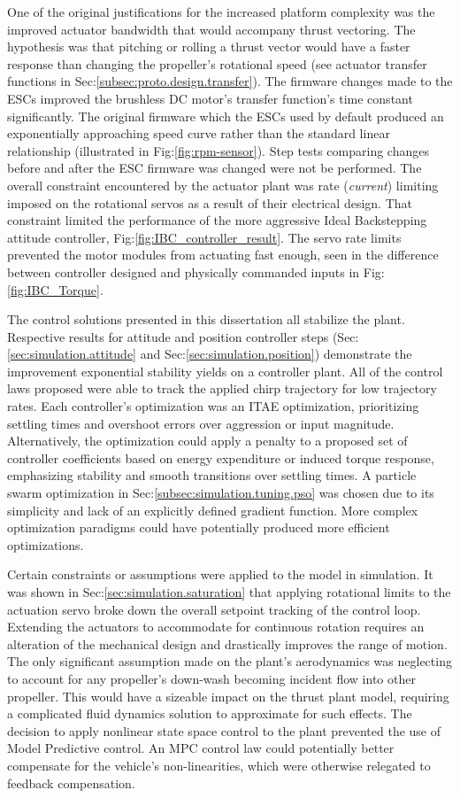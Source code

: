 \par
One of the original justifications for the increased platform complexity was the improved actuator bandwidth that would accompany thrust vectoring. The hypothesis was that pitching or rolling a thrust vector would have a faster response than changing the propeller's rotational speed (see actuator transfer functions in Sec:\ref{subsec:proto.design.transfer}). The firmware changes made to the ESCs improved the brushless DC motor's transfer function's time constant significantly. The original firmware which the ESCs used by default produced an exponentially approaching speed curve rather than the standard linear relationship (illustrated in Fig:\ref{fig:rpm-sensor}). Step tests comparing changes before and after the ESC firmware was changed were not be performed. The overall constraint encountered by the actuator plant was rate (\emph{current}) limiting imposed on the rotational servos as a result of their electrical design. That constraint limited the performance of the more aggressive Ideal Backstepping attitude controller, Fig:\ref{fig:IBC_controller_result}. The servo rate limits prevented the motor modules from actuating fast enough, seen in the difference between controller designed and physically commanded inputs in Fig:\ref{fig:IBC_Torque}.
\par
The control solutions presented in this dissertation all stabilize the plant. Respective results for attitude and position controller steps (Sec:\ref{sec:simulation.attitude} and Sec:\ref{sec:simulation.position}) demonstrate the improvement exponential stability yields on a controller plant. All of the control laws proposed were able to track the applied chirp trajectory for low trajectory rates. Each controller's optimization was an ITAE optimization, prioritizing settling times and overshoot errors over aggression or input magnitude. Alternatively, the optimization could apply a penalty to a proposed set of controller coefficients based on energy expenditure or induced torque response, emphasizing stability and smooth transitions over settling times. A particle swarm optimization in Sec:\ref{subsec:simulation.tuning.pso} was chosen due to its simplicity and lack of an explicitly defined gradient function. More complex optimization paradigms could have potentially produced more efficient optimizations.
\par
Certain constraints or assumptions were applied to the model in simulation. It was shown in Sec:\ref{sec:simulation.saturation} that applying rotational limits to the actuation servo broke down the overall setpoint tracking of the control loop. Extending the actuators to accommodate for continuous rotation requires an alteration of the mechanical design and drastically improves the range of motion. The only significant assumption made on the plant's aerodynamics was neglecting to account for any propeller's down-wash becoming incident flow into other propeller. This would have a sizeable impact on the thrust plant model, requiring a complicated fluid dynamics solution to approximate for such effects. The decision to apply nonlinear state space control to the plant prevented the use of Model Predictive control. An MPC control law could potentially better compensate for the vehicle's non-linearities, which were otherwise relegated to feedback compensation.
